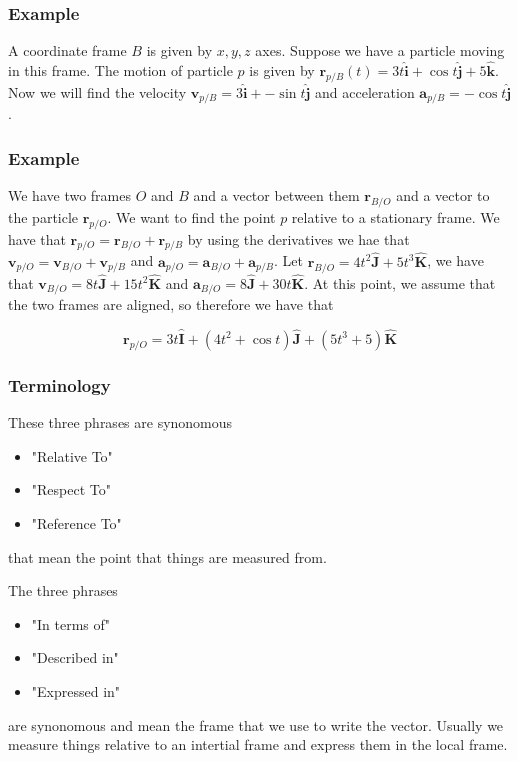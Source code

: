 \documentclass[a4paper]{article}
\begin{document}
\subsubsection*{Example}
A coordinate frame $B$ is given by $x,y,z$ axes. Suppose we have a particle moving in this frame. The motion of particle $p$ is given by $\mathbf{r}_{p/B}(t) = 3t \hat{\mathbf{i}} + \cos t \hat{\mathbf{j}} + 5\hat{\mathbf{k}}$. Now we will find the velocity $\mathbf{v}_{p/B} = 3\hat{\mathbf{i}} + -\sin t \hat{\mathbf{j}}$ and acceleration $\mathbf{a}_{p/B} = -\cos t \hat{\mathbf{j}}$.

\subsubsection*{Example}
We have two frames $O$ and $B$ and a vector between them $\mathbf{r}_{B/O}$ and a vector to the particle $\mathbf{r}_{p/O}$. We want to find the point $p$ relative to a stationary frame. We have that $\mathbf{r}_{p/O} = \mathbf{r}_{B/O} + \mathbf{r}_{p/B}$ by using the derivatives we hae that $\mathbf{v}_{p/O} = \mathbf{v}_{B/O} + \mathbf{v}_{p/B}$ and $\mathbf{a}_{p/O} = \mathbf{a}_{B/O} + \mathbf{a}_{p/B}$. Let $\mathbf{r}_{B/O} = 4t^2 \hat{\mathbf{J}} + 5t^3\hat{\mathbf{K}}$, we have that $\mathbf{v}_{B/O} = 8t \hat{\mathbf{J}} + 15t^2 \hat{\mathbf{K}}$ and $\mathbf{a}_{B/O} = 8\hat{\mathbf{J}} + 30t\hat{\mathbf{K}}$. At this point, we assume that the two frames are aligned, so therefore we have that 

\[
\mathbf{r}_{p/O} = 3t\hat{\mathbf{I}} + (4t^2 + \cos t) \hat{\mathbf{J}} + (5t^3 + 5)\hat{\mathbf{K}}
\]

\subsubsection*{Terminology}

These three phrases are synonomous
\begin{itemize}
    \item "Relative To"
    \item "Respect To"
    \item "Reference To"
    
\end{itemize}
that mean the point that things are measured from.

The three phrases
\begin{itemize}
    \item "In terms of"
    \item "Described in"
    \item "Expressed in"
\end{itemize}
are synonomous and mean the frame that we use to write the vector.
Usually we measure things relative to an intertial frame and express them in the local frame.
\end{document}
